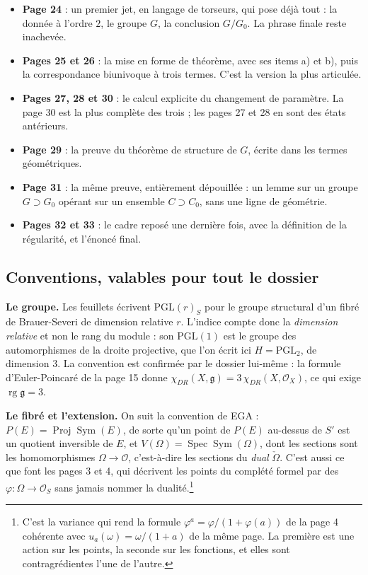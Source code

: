 \documentclass[11pt,a4paper]{article}
\begin{document}
\begin{itemize}
\item \textbf{Page 24} : un premier jet, en langage de torseurs, qui pose
déjà tout : la donnée à l'ordre $2$, le groupe $G$, la conclusion
$G/G_0$. La phrase finale reste inachevée.
\item \textbf{Pages 25 et 26} : la mise en forme de théorème, avec ses items
a) et b), puis la correspondance biunivoque à trois termes. C'est la version
la plus articulée.
\item \textbf{Pages 27, 28 et 30} : le calcul explicite du changement de
paramètre. La page 30 est la plus complète des trois ; les pages 27 et 28 en
sont des états antérieurs.
\item \textbf{Page 29} : la preuve du théorème de structure de $G$, écrite
dans les termes géométriques.
\item \textbf{Page 31} : la même preuve, entièrement dépouillée : un lemme
sur un groupe $G \supset G_0$ opérant sur un ensemble $C \supset C_0$, sans
une ligne de géométrie.
\item \textbf{Pages 32 et 33} : le cadre reposé une dernière fois, avec la
définition de la régularité, et l'énoncé final.
\end{itemize}

\subsection*{Conventions, valables pour tout le dossier}

\textbf{Le groupe.} Les feuillets écrivent $\mathrm{PGL}(r)_S$ pour le groupe
structural d'un fibré de Brauer-Severi de dimension relative $r$. L'indice
compte donc la \emph{dimension relative} et non le rang du module : son
$\mathrm{PGL}(1)$ est le groupe des automorphismes de la droite projective,
que l'on écrit ici $H = \mathrm{PGL}_2$, de dimension $3$. La convention est
confirmée par le dossier lui-même : la formule d'Euler-Poincaré de la page 15
donne $\chi_{DR}(X, \mathfrak{g}) = 3\,\chi_{DR}(X, \mathcal{O}_X)$, ce qui
exige $\operatorname{rg} \mathfrak{g} = 3$.

\textbf{Le fibré et l'extension.} On suit la convention de EGA :
$P(E) = \operatorname{Proj} \operatorname{Sym}(E)$, de sorte qu'un point de
$P(E)$ au-dessus de $S'$ est un quotient inversible de $E$, et
$V(\Omega) = \operatorname{Spec} \operatorname{Sym}(\Omega)$, dont les
sections sont les homomorphismes $\Omega \to \mathcal{O}$, c'est-à-dire les
sections du \emph{dual} $\check{\Omega}$. C'est aussi ce que font les
pages 3 et 4, qui décrivent les points du complété formel par des
$\varphi : \Omega \to \mathcal{O}_S$ sans jamais nommer la
dualité.\footnote{C'est la variance qui rend la
formule $\varphi^a = \varphi/(1+\varphi(a))$ de la page 4 cohérente avec
$u_a(\omega) = \omega/(1+a)$ de la même page. La première est une action sur
les points, la seconde sur les fonctions, et elles sont contragrédientes
l'une de l'autre.}
\end{document}
